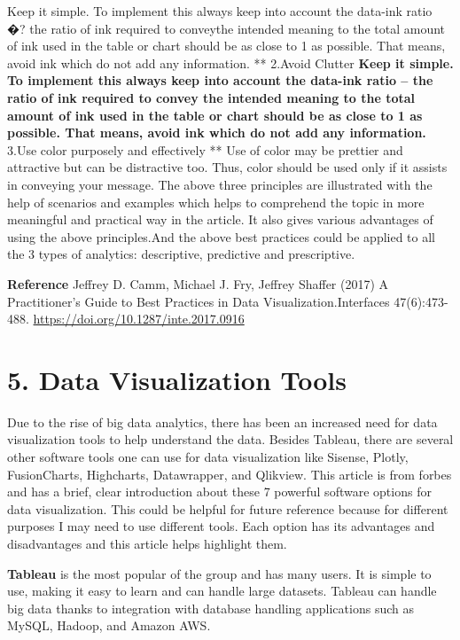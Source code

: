 \documentclass[]{book}
\theoremstyle{definition}
\theoremstyle{definition}
\theoremstyle{definition}
\theoremstyle{remark}
\begin{document}
Keep it simple. To implement this always keep into account the data-ink
ratio �? the ratio of ink required to conveythe intended meaning to the
total amount of ink used in the table or chart should be as close to 1
as possible. That means, avoid ink which do not add any information. **
2.Avoid Clutter \textbf{ Keep it simple. To implement this always keep
into account the data-ink ratio -- the ratio of ink required to convey
the intended meaning to the total amount of ink used in the table or
chart should be as close to 1 as possible. That means, avoid ink which
do not add any information. } 3.Use color purposely and effectively **
Use of color may be prettier and attractive but can be distractive too.
Thus, color should be used only if it assists in conveying your message.
The above three principles are illustrated with the help of scenarios
and examples which helps to comprehend the topic in more meaningful and
practical way in the article. It also gives various advantages of using
the above principles.And the above best practices could be applied to
all the 3 types of analytics: descriptive, predictive and prescriptive.

\textbf{Reference} Jeffrey D. Camm, Michael J. Fry, Jeffrey Shaffer
(2017) A Practitioner's Guide to Best Practices in Data
Visualization.Interfaces 47(6):473-488.
\url{https://doi.org/10.1287/inte.2017.0916}

\section{5. Data Visualization Tools}\label{data-visualization-tools}

Due to the rise of big data analytics, there has been an increased need
for data visualization tools to help understand the data. Besides
Tableau, there are several other software tools one can use for data
visualization like Sisense, Plotly, FusionCharts, Highcharts,
Datawrapper, and Qlikview. This article is from forbes and has a brief,
clear introduction about these 7 powerful software options for data
visualization. This could be helpful for future reference because for
different purposes I may need to use different tools. Each option has
its advantages and disadvantages and this article helps highlight them.

\textbf{Tableau} is the most popular of the group and has many users. It
is simple to use, making it easy to learn and can handle large datasets.
Tableau can handle big data thanks to integration with database handling
applications such as MySQL, Hadoop, and Amazon AWS.
\end{document}
